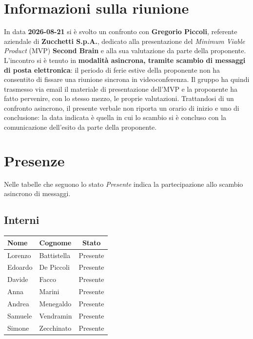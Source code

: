 \documentclass[a4paper, 10pt, colorlinks=true, linkcolor=black, urlcolor=blue, citecolor=blue, hidelinks]{article}
\newcommand{\dataverbale}{2026-08-21}
\def\templatedir{../../../../templates}
\begin{document}
\begin{titlepage}
    
\end{titlepage}

\newpage

\pagestyle{fancy}

\tableofcontents

\newpage
{}

\section{Informazioni sulla riunione}

In data \textbf{\dataverbale} si è svolto un confronto con \textbf{Gregorio Piccoli}, referente aziendale di \textbf{Zucchetti S.p.A.}, dedicato alla presentazione del \textit{Minimum Viable Product} (MVP) \textbf{Second Brain} e alla sua valutazione da parte della proponente.
L'incontro si è tenuto in \textbf{modalità asincrona, tramite scambio di messaggi di posta elettronica}: il periodo di ferie estive della proponente non ha consentito di fissare una riunione sincrona in videoconferenza. Il gruppo ha quindi trasmesso via email il materiale di presentazione dell'MVP e la proponente ha fatto pervenire, con lo stesso mezzo, le proprie valutazioni.
Trattandosi di un confronto asincrono, il presente verbale non riporta un orario di inizio e uno di conclusione: la data indicata è quella in cui lo scambio si è concluso con la comunicazione dell'esito da parte della proponente.

\section{Presenze}

Nelle tabelle che seguono lo stato \textit{Presente} indica la partecipazione allo scambio asincrono di messaggi.

\subsection{Interni}
\begin{center}
\begin{tabular}{|l|l|c|}
\hline
\textbf{Nome} & \textbf{Cognome} & \textbf{Stato} \\
\hline
Lorenzo & Battistella & Presente \\
Edoardo & De Piccoli & Presente \\
Davide & Facco & Presente \\
Anna & Marini & Presente \\
Andrea & Menegaldo & Presente \\
Samuele & Vendramin & Presente \\
Simone & Zecchinato & Presente \\
\hline
\end{tabular}
\end{center}
\end{document}
